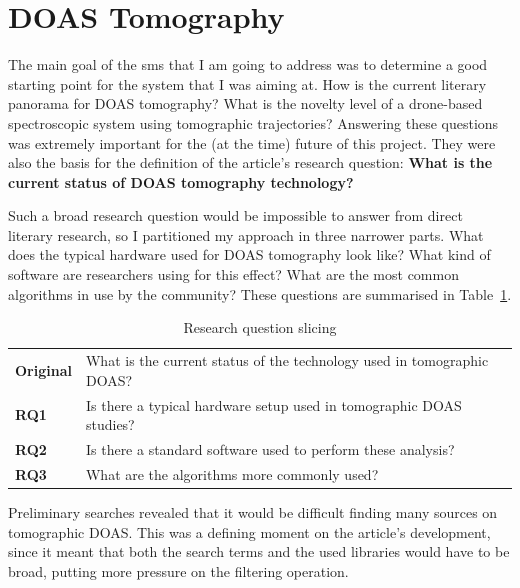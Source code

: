 \section{DOAS Tomography}%
\label{sec:litrev_doas_tomography}

The main goal of the \gls{sms} that I am going to address was to
determine a good starting point for the system that I was aiming at. How
is the current literary panorama for DOAS tomography? What is the
novelty level of a drone-based spectroscopic system using tomographic
trajectories? Answering these questions was extremely important for the
(at the time) future of this project. They were also the basis for the
definition of the article's research question: \textbf{What is the
current status of DOAS tomography technology?}

Such a broad research question would be impossible to answer from direct
literary research, so I partitioned my approach in three narrower parts.
What does the typical hardware used for DOAS tomography look like? What
kind of software are researchers using for this effect? What are the
most common algorithms in use by the community? These questions are
summarised in Table~\ref{tab:lit_rev_RQ1}.

\begin{table}[htb]
\centering
\small
\caption{Research question slicing}
\label{tab:lit_rev_RQ1}
    \begin{tabularx}{\textwidth}{lX}
        \toprule
        \textbf{Original} & What is the current status of the technology used in
        tomographic DOAS? \\
        \textbf{RQ1} & Is there a typical hardware setup used in tomographic
        DOAS studies? \\
        \textbf{RQ2} & Is there a standard software used to perform these
        analysis? \\
        \textbf{RQ3} & What are the algorithms more commonly used?\\\bottomrule
    \end{tabularx}
\end{table}

Preliminary searches revealed that it would be difficult finding many
sources on tomographic \gls{DOAS}. This was a defining moment on the
article's development, since it meant that both the search terms and the
used libraries would have to be broad, putting more pressure on the
filtering operation.

